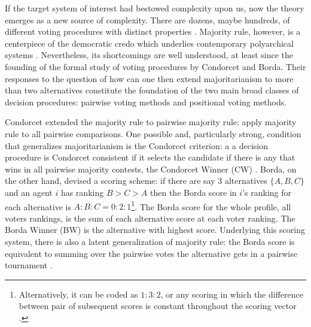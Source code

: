 \documentclass[hidelinks,11pt]{article}
\begin{document}
If the target system of interest had bestowed complexity upon us, now the theory
emerges as a new source of complexity. There are dozens, maybe hundreds, of
different voting procedures with distinct properties
\parencite{sep-voting-methods, felsenthal2018voting, felsenthal2012electoral}.
Majority rule, however, is a centerpiece of the democratic credo which underlies
contemporary polyarchical systems \parencite{dahl1989democracy}. Nevertheless,
its shortcomings are well understood, at least since the founding of the formal
study of voting procedures by Condorcet and Borda. Their responses to the
question of how can one then extend majoritarianism to more than two
alternatives constitute the foundation of the two main broad classes of decision
procedures: pairwise voting methods and positional voting methods.

Condorcet extended the majority rule to pairwise majority rule: apply
majority rule to all pairwise comparisons. One possible and, particularly
strong, condition that generalizes majoritarianism is the Condorcet criterion: a
a decision procedure is Condorcet consistent if it selects the candidate if there
is any that wins in all pairwise majority contests, the Condorcet Winner (CW)
\parencite{Felsenthal_1992}. Borda, on the other hand, devised a scoring scheme:
if there are say 3 alternatives \(\{A,B,C\}\) and an agent \(i\) has ranking
\(B>C>A\) then the Borda score in \(i\)'s ranking for each alternative is
\(A:B:C = 0:2:1\)\footnote{Alternatively, it can be coded as \(1:3:2\), or any
  scoring in which the difference between pair of subsequent scores is constant
  throughout the scoring vector \parencite{saari2012geometry} .}. The Borda
score for the whole profile, all voters rankings, is the sum of each alternative
score at each voter ranking. The Borda Winner (BW) is the alternative with
highest score. Underlying this scoring system, there is also a latent
generalization of majority rule: the Borda score is equivalent to summing over
the pairwise votes the alternative gets in a pairwise tournament
\parencite{nurmi2002voting}.
\end{document}
